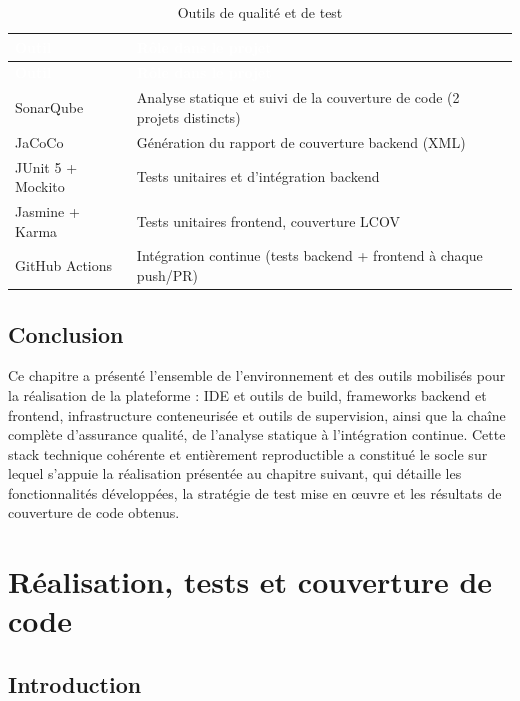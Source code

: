 \documentclass[12pt,a4paper]{report}
\begin{document}
\begin{longtable}{@{}>{\raggedright\arraybackslash}p{}p{}@{}}
\caption{Outils de qualité et de test}\\
\hline
\rowcolor{darkblue}\textcolor{white}{\textbf{Outil}} & \textcolor{white}{\textbf{Rôle dans le projet}} \\
\hline
\endfirsthead
\hline
\rowcolor{darkblue}\textcolor{white}{\textbf{Outil}} & \textcolor{white}{\textbf{Rôle dans le projet}} \\
\hline
\endhead
\hline
\endfoot
SonarQube & Analyse statique et suivi de la couverture de code (2 projets distincts) \\
\hline
JaCoCo & Génération du rapport de couverture backend (XML) \\
\hline
JUnit 5 + Mockito & Tests unitaires et d'intégration backend \\
\hline
Jasmine + Karma & Tests unitaires frontend, couverture LCOV \\
\hline
GitHub Actions & Intégration continue (tests backend + frontend à chaque push/PR) \\
\hline
\end{longtable}

\section*{Conclusion}

Ce chapitre a présenté l'ensemble de l'environnement et des outils mobilisés pour la réalisation de la plateforme : IDE et outils de build, frameworks backend et frontend, infrastructure conteneurisée et outils de supervision, ainsi que la chaîne complète d'assurance qualité, de l'analyse statique à l'intégration continue. Cette stack technique cohérente et entièrement reproductible a constitué le socle sur lequel s'appuie la réalisation présentée au chapitre suivant, qui détaille les fonctionnalités développées, la stratégie de test mise en \oe uvre et les résultats de couverture de code obtenus.

\chapter{Réalisation, tests et couverture de code}

\section*{Introduction}
\end{document}

